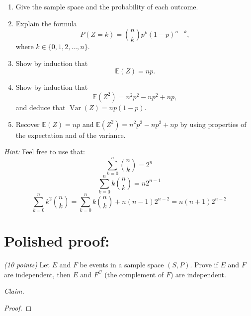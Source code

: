 \documentclass[12pt]{article}
\newcommand{\E}{\mathbb{E}}	%
\DeclareMathOperator{\Var}{Var}  %
\begin{document}
\begin{enumerate}
\begin{enumerate}
\item Give the sample space and the probability of each outcome. \newline


\item Explain the formula
\[
P(Z = k) = \binom{n}{k} p^k (1-p)^{n-k},
\]
where \( k \in \{0, 1, 2, \dots, n \} \). \newline


\item Show by induction that
\[
\E(Z) = np.
\] \newline


\item Show by induction that
\[
\E(Z^2) = n^2 p^2 - np^2 + np,
\]
and deduce that \( \Var(Z) = np(1-p) \). \newline


\item Recover \( \E(Z) = np \)
and
\( \E(Z^2) = n^2 p^2 - np^2 + np \)
by using properties of the expectation and of the variance. \newline

\end{enumerate}

\emph{Hint:} Feel free to use that:
    \[ \sum_{k=0}^n \binom{n}{k} = 2^n \]
    \[
     \sum_{k=0}^n k \binom{n}{k} = n 2^{n-1} \]
\[
    \sum_{k=0}^n k^2  \binom{n}{k} = \sum_{k=0}^n k  \binom{n}{k} + n (n-1) 2^{n-2} 
    =  n (n+1) 2^{n-2} 
    \]

\end{enumerate}
\newpage %

\section*{Polished proof:} 

\emph{(10 points)} Let \( E \) and \( F \) be events in a sample space \( (S,P) \). Prove if \( E \) and \( F \) are independent, then \( E \) and \( F^C \) (the complement of \( F \)) are independent.

\noindent \emph{Claim.}

\begin{proof}
\end{proof}
\end{document}
